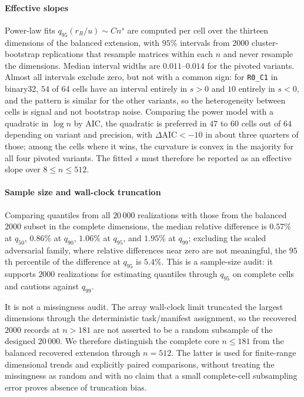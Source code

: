 \documentclass[supplement,review,onefignum,onetabnum]{siamart251216}
\begin{document}
\paragraph{Effective slopes}
Power-law fits $q_{95}(r_R/u)\sim Cn^{s}$ are computed per cell over the thirteen dimensions of
the balanced extension, with $95\%$ intervals from $2000$ cluster-bootstrap replications that
resample matrices within each $n$ and never resample the dimensions. Median interval widths are
$0.011$--$0.014$ for the pivoted variants. Almost all intervals exclude zero, but not with a
common sign: for \texttt{R0\_C1} in binary32, $54$ of $64$ cells have an interval entirely in
$s>0$ and $10$ entirely in $s<0$, and the pattern is similar for the other variants, so the
heterogeneity between cells is signal and not bootstrap noise. Comparing the power model with a
quadratic in $\log n$ by AIC, the quadratic is preferred in $47$ to $60$ cells out of $64$
depending on variant and precision, with $\Delta\mathrm{AIC}<-10$ in about three quarters of
those; among the cells where it wins, the curvature is convex in the majority for all four
pivoted variants. The fitted $s$ must therefore be reported as an effective slope over
$8\le n\le512$.

\paragraph{Sample size and wall-clock truncation}
Comparing quantiles from all $20\,000$ realizations with those from the balanced $2000$ subset in
the complete dimensions, the median relative difference is $0.57\%$ at $q_{50}$, $0.86\%$ at
$q_{90}$, $1.06\%$ at $q_{95}$, and $1.95\%$ at $q_{99}$; excluding the scaled adversarial family,
where relative differences near zero are not meaningful, the $95$th percentile of the difference
at $q_{95}$ is $5.4\%$. This is a sample-size audit: it supports $2000$ realizations for estimating
quantiles through $q_{95}$ on complete cells and cautions against $q_{99}$.

It is not a missingness audit. The array wall-clock limit truncated the largest dimensions through
the deterministic task/manifest assignment, so the recovered $2000$ records at $n>181$ are not
asserted to be a random subsample of the designed $20\,000$. We therefore distinguish the complete
core $n\le181$ from the balanced recovered extension through $n=512$. The latter is used for
finite-range dimensional trends and explicitly paired comparisons, without treating the missingness as random and with no
claim that a small complete-cell subsampling error proves absence of truncation bias.
\end{document}
